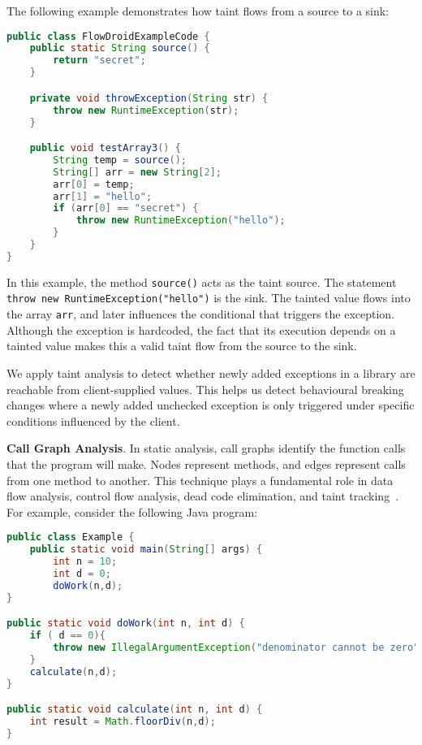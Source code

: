 The following example demonstrates how taint flows from a source to a sink:

\begin{lstlisting}[language=java]
public class FlowDroidExampleCode {
    public static String source() {
        return "secret";
    }

    private void throwException(String str) {
        throw new RuntimeException(str);
    }

    public void testArray3() {
        String temp = source();
        String[] arr = new String[2];
        arr[0] = temp;
        arr[1] = "hello";
        if (arr[0] == "secret") {
            throw new RuntimeException("hello");
        }
    }
}
\end{lstlisting}

In this example, the method \texttt{source()} acts as the taint source. The statement \texttt{throw new RuntimeException("hello")} is the sink. The tainted value flows into the array \texttt{arr}, and later influences the conditional that triggers the exception. Although the exception is hardcoded, the fact that its execution depends on a tainted value makes this a valid taint flow from the source to the sink.

We apply taint analysis to detect whether newly added exceptions in a library are reachable from client-supplied values. This helps us detect behavioural breaking changes where a newly added unchecked exception is only triggered under specific conditions influenced by the client.

\textbf{Call Graph Analysis}. In static analysis, call graphs identify the function calls that the
program will make. Nodes represent methods, and edges represent calls from one method to another.
This technique plays a fundamental role in data flow analysis, control flow analysis,
dead code elimination, and taint tracking~\cite{Keshani2024}.
For example, consider the following Java program:
\begin{lstlisting}[language=java]
public class Example {
    public static void main(String[] args) {
        int n = 10;
        int d = 0;
        doWork(n,d);
}

public static void doWork(int n, int d) {
    if ( d == 0){
        throw new IllegalArgumentException("denominator cannot be zero");
    }
    calculate(n,d);
}

public static void calculate(int n, int d) {
    int result = Math.floorDiv(n,d);
}
\end{lstlisting}

